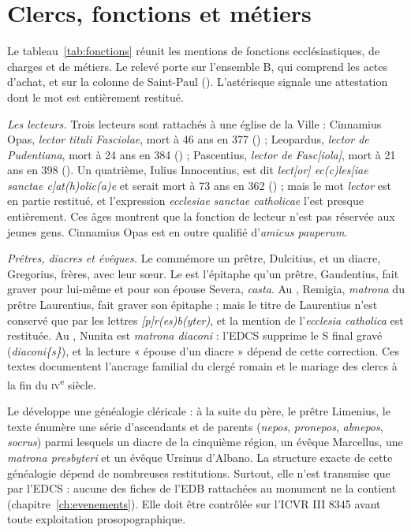 \section{Clercs, fonctions et métiers}

Le tableau~\ref{tab:fonctions} réunit les mentions de fonctions ecclésiastiques, de charges et de métiers. Le relevé porte sur l’ensemble B, qui comprend les actes d’achat, et sur la colonne de Saint-Paul (). L’astérisque signale une attestation dont le mot est entièrement restitué.



\emph{Les lecteurs.} Trois lecteurs sont rattachés à une église de la Ville : Cinnamius Opas, \emph{lector tituli Fasciolae}, mort à 46 ans en 377 () ; Leopardus, \emph{lector de Pudentiana}, mort à 24 ans en 384 () ; Pascentius, \emph{lector de Fasc[iola]}, mort à 21 ans en 398 (). Un quatrième, Iulius Innocentius, est dit \emph{lect[or] ec(c)les[iae sanctae c]at(h)olic(a)e} et serait mort à 73 ans en 362 () ; mais le mot \emph{lector} est en partie restitué, et l’expression \emph{ecclesiae sanctae catholicae} l’est presque entièrement. Ces âges montrent que la fonction de lecteur n’est pas réservée aux jeunes gens. Cinnamius Opas est en outre qualifié d’\emph{amicus pauperum}.

\emph{Prêtres, diacres et évêques.} Le  commémore un prêtre, Dulcitius, et un diacre, Gregorius, frères, avec leur sœur. Le  est l’épitaphe qu’un prêtre, Gaudentius, fait graver pour lui-même et pour son épouse Severa, \emph{casta}. Au , Remigia, \emph{matrona} du prêtre Laurentius, fait graver son épitaphe ; mais le titre de Laurentius n’est conservé que par les lettres \emph{[p]r(es)b(yter)}, et la mention de l’\emph{ecclesia catholica} est restituée. Au , Nunita est \emph{matrona diaconi} : l’EDCS supprime le S final gravé (\emph{diaconi\{s\}}), et la lecture « épouse d’un diacre » dépend de cette correction. Ces textes documentent l’ancrage familial du clergé romain et le mariage des clercs à la fin du \textsc{iv}\textsuperscript{e} siècle.

Le  développe une généalogie cléricale : à la suite du père, le prêtre Limenius, le texte énumère une série d’ascendants et de parents (\emph{nepos}, \emph{pronepos}, \emph{abnepos}, \emph{socrus}) parmi lesquels un diacre de la cinquième région, un évêque Marcellus, une \emph{matrona presbyteri} et un évêque Ursinus d’Albano. La structure exacte de cette généalogie dépend de nombreuses restitutions. Surtout, elle n’est transmise que par l’EDCS : aucune des fiches de l’EDB rattachées au monument ne la contient (chapitre~\ref{ch:evenements}). Elle doit être contrôlée sur l’ICVR III 8345 avant toute exploitation prosopographique.

